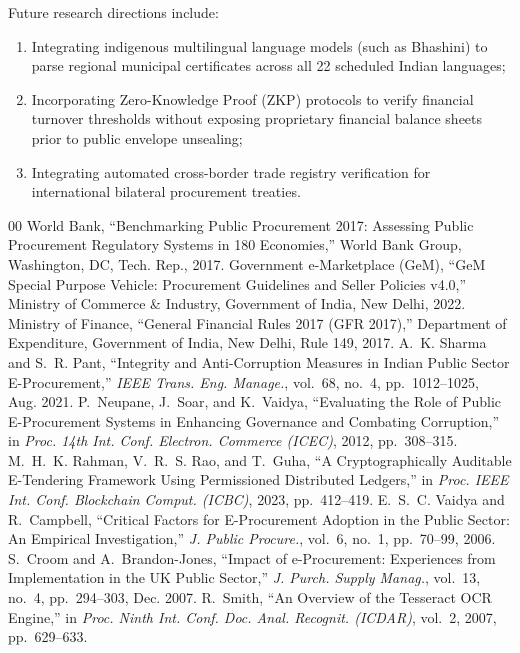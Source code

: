 \documentclass[conference]{IEEEtran}
\begin{document}
Future research directions include:
\begin{enumerate}
    \item Integrating indigenous multilingual language models (such as Bhashini) to parse regional municipal certificates across all 22 scheduled Indian languages;
    \item Incorporating Zero-Knowledge Proof (ZKP) protocols to verify financial turnover thresholds without exposing proprietary financial balance sheets prior to public envelope unsealing;
    \item Integrating automated cross-border trade registry verification for international bilateral procurement treaties.
\end{enumerate}

\balance
\begin{thebibliography}{00}
 World Bank, ``Benchmarking Public Procurement 2017: Assessing Public Procurement Regulatory Systems in 180 Economies,'' World Bank Group, Washington, DC, Tech. Rep., 2017.
 Government e-Marketplace (GeM), ``GeM Special Purpose Vehicle: Procurement Guidelines and Seller Policies v4.0,'' Ministry of Commerce \& Industry, Government of India, New Delhi, 2022.
 Ministry of Finance, ``General Financial Rules 2017 (GFR 2017),'' Department of Expenditure, Government of India, New Delhi, Rule 149, 2017.
 A.~K. Sharma and S.~R. Pant, ``Integrity and Anti-Corruption Measures in Indian Public Sector E-Procurement,'' \textit{IEEE Trans. Eng. Manage.}, vol.~68, no.~4, pp.~1012--1025, Aug. 2021.
 P.~Neupane, J.~Soar, and K.~Vaidya, ``Evaluating the Role of Public E-Procurement Systems in Enhancing Governance and Combating Corruption,'' in \textit{Proc. 14th Int. Conf. Electron. Commerce (ICEC)}, 2012, pp.~308--315.
 M.~H.~K. Rahman, V.~R.~S. Rao, and T.~Guha, ``A Cryptographically Auditable E-Tendering Framework Using Permissioned Distributed Ledgers,'' in \textit{Proc. IEEE Int. Conf. Blockchain Comput. (ICBC)}, 2023, pp.~412--419.
 E.~S.~C. Vaidya and R.~Campbell, ``Critical Factors for E-Procurement Adoption in the Public Sector: An Empirical Investigation,'' \textit{J. Public Procure.}, vol.~6, no.~1, pp.~70--99, 2006.
 S.~Croom and A.~Brandon-Jones, ``Impact of e-Procurement: Experiences from Implementation in the UK Public Sector,'' \textit{J. Purch. Supply Manag.}, vol.~13, no.~4, pp.~294--303, Dec. 2007.
 R.~Smith, ``An Overview of the Tesseract OCR Engine,'' in \textit{Proc. Ninth Int. Conf. Doc. Anal. Recognit. (ICDAR)}, vol.~2, 2007, pp.~629--633.

\end{thebibliography}
\end{document}

